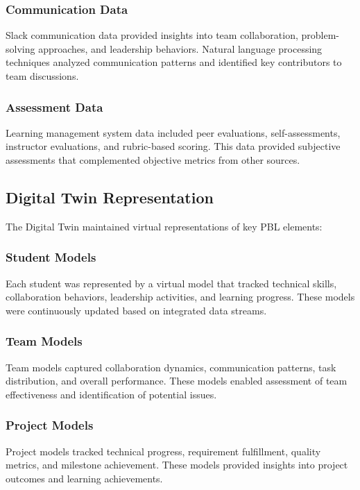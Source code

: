 \documentclass[review]{elsarticle}
\begin{document}
\subsubsection{Communication Data}
Slack communication data provided insights into team collaboration, problem-solving approaches, and leadership behaviors. Natural language processing techniques analyzed communication patterns and identified key contributors to team discussions.

\subsubsection{Assessment Data}
Learning management system data included peer evaluations, self-assessments, instructor evaluations, and rubric-based scoring. This data provided subjective assessments that complemented objective metrics from other sources.

\subsection{Digital Twin Representation}
\label{sec:representation}

The Digital Twin maintained virtual representations of key PBL elements:

\subsubsection{Student Models}
Each student was represented by a virtual model that tracked technical skills, collaboration behaviors, leadership activities, and learning progress. These models were continuously updated based on integrated data streams.

\subsubsection{Team Models}
Team models captured collaboration dynamics, communication patterns, task distribution, and overall performance. These models enabled assessment of team effectiveness and identification of potential issues.

\subsubsection{Project Models}
Project models tracked technical progress, requirement fulfillment, quality metrics, and milestone achievement. These models provided insights into project outcomes and learning achievements.
\end{document}
